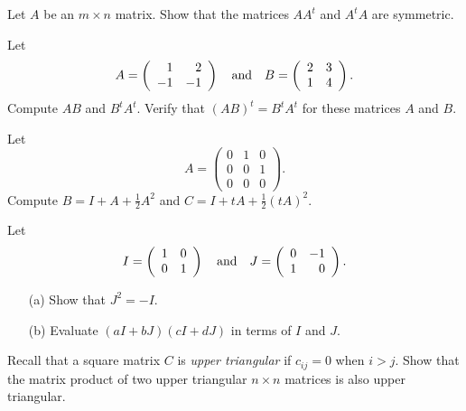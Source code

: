 \documentclass{ximera}
\begin{document}
\EXER


\TEXER


\begin{exercise} \label{c4.7.2.2}
Let $A$ be an $m\times n$ matrix.  Show that the matrices $A A^t$ and
$A^t A$ are symmetric.
\end{exercise}


\begin{exercise} \label{c4.7.3}
Let
\[
A=\left(\begin{array}{rr} 1 & 2\\ -1 &-1\end{array}\right) \quad\mbox{and}\quad B =\left(\begin{array}{rr} 2 & 3\\ 1 &4\end{array}\right).
\]
Compute $AB$ and $B^tA^t$.  Verify that $(AB)^t=B^tA^t$ for these
matrices $A$ and $B$.
\end{exercise}

\begin{exercise} \label{c4.7.4}
Let
\[
A = \left(\begin{array}{ccc} 0 & 1 & 0\\ 0 & 0 & 1 \\ 0 & 0 & 0 \end{array}
\right).
\]
Compute $B=I+A+\frac{1}{2}A^2$ and $C=I+tA+\frac{1}{2}(tA)^2$.
\end{exercise}

\begin{exercise} \label{c4.7.5}
Let
\[
I = \left(\begin{array}{rr} 1 & 0\\ 0 &1\end{array}\right) \quad\mbox{and}\quad J =\left(\begin{array}{rr} 0 & -1\\ 1 &0\end{array}\right).
\]
\begin{itemize}
\item[(a)] Show that $J^2=-I$.
\item[(b)] Evaluate $(aI+bJ)(cI+dJ)$ in terms of $I$ and $J$.
\end{itemize}
\end{exercise}

\begin{exercise} \label{c4.7.8}
Recall that a square matrix $C$ is {\em upper triangular\/} if $c_{ij}=0$
when $i>j$.  Show that the matrix product of two upper triangular $n\times n$
matrices is also upper triangular.
\end{exercise}


\CEXER
\end{document}
